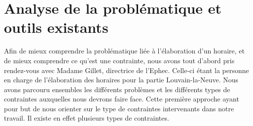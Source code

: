
\chapter{Analyse de la problématique et outils existants}


Afin de mieux comprendre la problématique liée à l'élaboration d'un horaire, et de mieux comprendre ce qu'est une contrainte, nous avons tout d'abord pris rendez-vous avec Madame Gillet, directrice de l'Ephec. Celle-ci étant la personne en charge de l'élaboration des horaires pour la partie Louvain-la-Neuve. Nous avons parcouru ensembles les différents problèmes et les différents types de contraintes auxquelles nous devrons faire face. Cette première approche ayant pour but de nous orienter sur le type de contraintes intervenants dans notre travail. Il existe en effet plusieurs types de contraintes.

